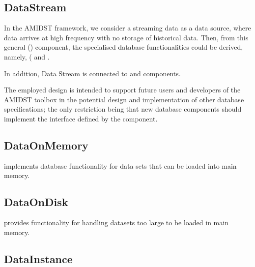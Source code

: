 \subsection{DataStream}

In the AMIDST framework, we consider a streaming data as a data source, where data arrives at high frequency with no storage of historical data. Then, from this general () component, the specialised database functionalities could be derived, namely, ( and .

In addition, Data Stream is connected to  and  components. 

The employed design is intended to support future users and developers of the AMIDST toolbox in the potential design and implementation of other database specifications; the only restriction being that new database components should implement the interface defined by the  component. 

\subsection{DataOnMemory}

 implements database functionality for data sets that can be loaded into main memory.

\subsection{DataOnDisk}

 provides functionality for handling datasets too large to be loaded in main memory.

\subsection{DataInstance}
  
